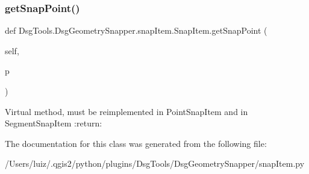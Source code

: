 \subsubsection{\texorpdfstring{get\+Snap\+Point()}{getSnapPoint()}}
{\footnotesize\ttfamily def Dsg\+Tools.\+Dsg\+Geometry\+Snapper.\+snap\+Item.\+Snap\+Item.\+get\+Snap\+Point (\begin{DoxyParamCaption}\item[{}]{self,  }\item[{}]{p }\end{DoxyParamCaption})}

\begin{DoxyVerb}Virtual method, must be reimplemented in PointSnapItem and in SegmentSnapItem
:return:
\end{DoxyVerb}
 

The documentation for this class was generated from the following file\+:\begin{DoxyCompactItemize}
\item 
/\+Users/luiz/.\+qgis2/python/plugins/\+Dsg\+Tools/\+Dsg\+Geometry\+Snapper/snap\+Item.\+py\end{DoxyCompactItemize}
